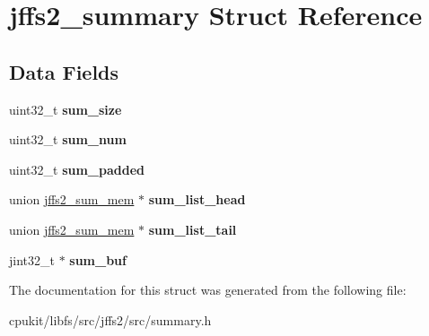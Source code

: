 \hypertarget{structjffs2__summary}{}\section{jffs2\+\_\+summary Struct Reference}
\label{structjffs2__summary}
\subsection*{Data Fields}
\begin{DoxyCompactItemize}
\item 
\mbox{\label{structjffs2__summary_a8f675c385dee605da741954525d66963}} 
uint32\+\_\+t {\bfseries sum\+\_\+size}
\item 
\mbox{\label{structjffs2__summary_ab569518ce0e061be40e9634726303671}} 
uint32\+\_\+t {\bfseries sum\+\_\+num}
\item 
\mbox{\label{structjffs2__summary_abd0e5d7a404bd02d45b47b17a4c755d6}} 
uint32\+\_\+t {\bfseries sum\+\_\+padded}
\item 
\mbox{\label{structjffs2__summary_a241ae2c99befb6cc7c2c52ac7fb3c087}} 
union \mbox{\hyperlink{unionjffs2__sum__mem}{jffs2\+\_\+sum\+\_\+mem}} $\ast$ {\bfseries sum\+\_\+list\+\_\+head}
\item 
\mbox{\label{structjffs2__summary_a3b710118639275956f80a308e14badf9}} 
union \mbox{\hyperlink{unionjffs2__sum__mem}{jffs2\+\_\+sum\+\_\+mem}} $\ast$ {\bfseries sum\+\_\+list\+\_\+tail}
\item 
\mbox{\label{structjffs2__summary_ab39f008007e16f9d80166caf04592156}} 
jint32\+\_\+t $\ast$ {\bfseries sum\+\_\+buf}
\end{DoxyCompactItemize}


The documentation for this struct was generated from the following file\+:\begin{DoxyCompactItemize}
\item 
cpukit/libfs/src/jffs2/src/summary.\+h\end{DoxyCompactItemize}
